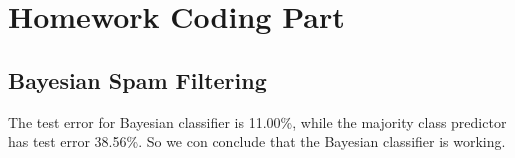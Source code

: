 \documentclass[12pt]{article}
\begin{document}
\setcounter{section}{1}
\section{Homework Coding Part}
\setcounter{subsection}{1}
\subsection{Bayesian Spam Filtering}
The test error for Bayesian classifier is 11.00\%, while the majority class predictor has test error 38.56\%.
So we con conclude that the Bayesian classifier is working.
\inputminted[linenos,bgcolor=black]{octave}{./hw2/problem2/Bayesian_spam_filtering.m}
\end{document}
